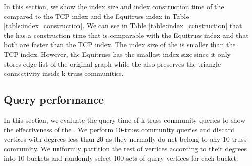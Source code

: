 In this section, we show the index size and index construction time of the \twolevelindex{} compared to the TCP index and the Equitruss index in Table \ref{table:index_construction}. 
We can see in Table \ref{table:index_construction} that the \twolevelindex{} has a construction time that is comparable with the Equitruss index and that both are faster than the TCP index. The index size of the \twolevelindex{} is smaller than the TCP index. %
However, the Equitruss has the smallest index size since it only stores edge list of the original graph while the \twolevelindex{} also preserves the triangle connectivity inside k-truss communities. 

\subsection{Query performance}
\label{eval_query_time}

In this section, we evaluate the query time of k-truss community queries to show the effectiveness of the \twolevelindex{}. 
We perform $10$-truss community queries and discard vertices with degrees less than $20$ as they normally do not belong to any $10$-truss community. 
We uniformly partition the rest of vertices according to their degrees into 10 buckets and randomly select 100 sets of query vertices for each bucket.

